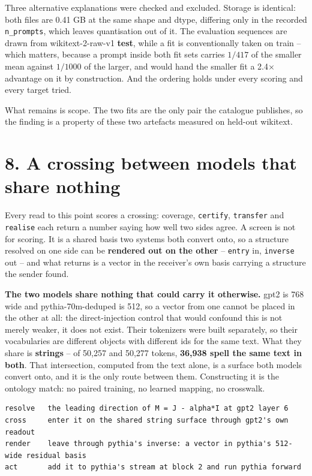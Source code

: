 \documentclass[10pt,letterpaper,twocolumn]{article}
\begin{document}
Three alternative explanations were checked and excluded. Storage is identical: both files are 0.41 GB at the same shape and dtype, differing only in the recorded \texttt{n\_\allowbreak{}prompts}, which leaves quantisation out of it. The evaluation sequences are drawn from wikitext-2-raw-v1 \textbf{test}, while a fit is conventionally taken on train -- which matters, because a prompt inside both fit sets carries \(1/417\) of the smaller mean against \(1/1000\) of the larger, and would hand the smaller fit a 2.4\(\times\) advantage on it by construction. And the ordering holds under every scoring and every target tried.

What remains is scope. The two fits are the only pair the catalogue publishes, so the finding is a property of these two artefacts measured on held-out wikitext.

\section{8. A crossing between models that share nothing}\label{8-a-crossing-between-models-that-share-nothing}

Every read to this point scores a crossing: coverage, \texttt{certify}, \texttt{transfer} and \texttt{realise} each
return a number saying how well two sides agree. A screen is not for scoring. It is a shared basis
two systems both convert onto, so a structure resolved on one side can be \textbf{rendered out on the
other} -- \texttt{entry} in, \texttt{inverse} out -- and what returns is a vector in the receiver's own basis
carrying a structure the sender found.

\textbf{The two models share nothing that could carry it otherwise.} gpt2 is 768 wide and pythia-70m-deduped
is 512, so a vector from one cannot be placed in the other at all: the direct-injection control
that would confound this is not merely weaker, it does not exist. Their tokenizers were built
separately, so their vocabularies are different objects with different ids for the same text. What
they share is \textbf{strings} -- of 50,257 and 50,277 tokens, \textbf{36,938 spell the same text in both}.
That intersection, computed from the text alone, is a surface both models convert onto, and it is
the only route between them. Constructing it is the ontology match: no paired training, no learned
mapping, no crosswalk.

\begin{verbatim}
resolve   the leading direction of M = J - alpha*I at gpt2 layer 6
cross     enter it on the shared string surface through gpt2's own readout
render    leave through pythia's inverse: a vector in pythia's 512-wide residual basis
act       add it to pythia's stream at block 2 and run pythia forward
\end{verbatim}
\end{document}
